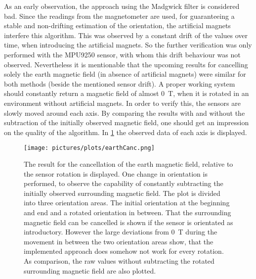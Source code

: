 As an early observation, the approach using the Madgwick filter is considered bad. Since the readings from the magnetometer are used, for guaranteeing a stable and non-drifting estimation of the orientation, the artificial magnets interfere this algorithm. This was observed by a constant drift of the values over time, when introducing the artificial magnets. So the further verification was only performed with the MPU9250 sensor, with whom this drift behaviour was not observed. Nevertheless it is mentionable that the upcoming results for cancelling solely the earth magnetic field (in absence of artificial magnets) were similar for both methods (beside the mentioned sensor drift). A proper working system should constantly return a magnetic field of almost \SI{0}{\tesla}, when it is rotated in an environment without artificial magnets. In order to verify this, the sensors are slowly moved around each axis. By comparing the results with and without the subtraction of the initially observed magnetic field, one should get an impression on the quality of the algorithm. In \ref{fig:earthCancelRes} the observed data of each axis is displayed.\\
\begin{figure}[!htb]
\centering
\texttt{[image: pictures/plots/earthCanc.png]} 
\caption[Quality of earth cancellation]
{The result for the cancellation of the earth magnetic field, relative to the sensor rotation is displayed. One change in orientation is performed, to observe the capability of constantly subtracting the initially observed surrounding magnetic field. The plot is divided into three orientation areas. The initial orientation at the beginning and end and a rotated orientation in between. That the surrounding magnetic field can be cancelled is shown if the sensor is orientated as introductory. However the large deviations from \SI{0}{\tesla} during the movement in between the two orientation areas show, that the implemented approach does somehow not work for every rotation. As comparison, the raw values without subtracting the rotated surrounding magnetic field are also plotted.}
\label{fig:earthCancelRes}
\end{figure}
